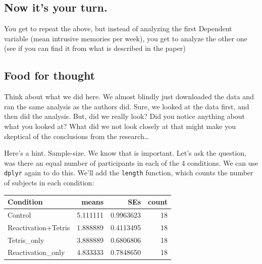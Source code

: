 \documentclass[]{book}
\newenvironment{Shaded}{\begin{snugshade}}{\end{snugshade}}
\newcommand{\KeywordTok}[1]{\textcolor[rgb]{0.13,0.29,0.53}{\textbf{{#1}}}}
\newcommand{\DataTypeTok}[1]{\textcolor[rgb]{0.13,0.29,0.53}{{#1}}}
\newcommand{\StringTok}[1]{\textcolor[rgb]{0.31,0.60,0.02}{{#1}}}
\newcommand{\NormalTok}[1]{{#1}}
\theoremstyle{definition}
\theoremstyle{definition}
\theoremstyle{definition}
\theoremstyle{remark}
\begin{document}
\subsection{Now it's your turn.}\label{now-its-your-turn.}

You get to repeat the above, but instead of analyzing the first
Dependent variable (mean intrusive memories per week), you get to
analyze the other one (see if you can find it from what is described in
the paper)

\subsection{Food for thought}\label{food-for-thought}

Think about what we did here. We almost blindly just downloaded the data
and ran the same analysis as the authors did. Sure, we looked at the
data first, and then did the analysis. But, did we really look? Did you
notice anything about what you looked at? What did we not look closely
at that might make you skeptical of the conclusions from the
research\ldots{}

Here's a hint. Sample-size. We know that is important. Let's ask the
question, was there an equal number of participants in each of the 4
conditions. We can use \texttt{dplyr} again to do this. We'll add the
\texttt{length} function, which counts the number of subjects in each
condition:

\begin{Shaded}
\end{Shaded}

\begin{tabular}{l|r|r|r}
\hline
Condition & means & SEs & count\\
\hline
Control & 5.111111 & 0.9963623 & 18\\
\hline
Reactivation+Tetris & 1.888889 & 0.4113495 & 18\\
\hline
Tetris\_only & 3.888889 & 0.6806806 & 18\\
\hline
Reactivation\_only & 4.833333 & 0.7848650 & 18\\
\hline
\end{tabular}
\end{document}
